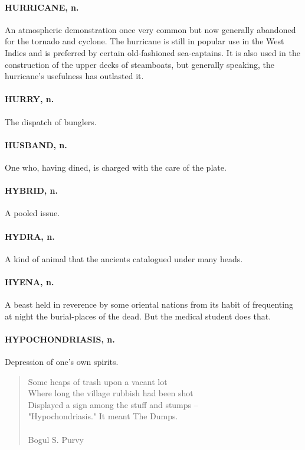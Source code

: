 \documentclass[11pt]{article}
\begin{document}
\paragraph{HURRICANE, n.}  An atmospheric demonstration once very common but now
generally abandoned for the tornado and cyclone.  The hurricane is
still in popular use in the West Indies and is preferred by certain
old-fashioned sea-captains.  It is also used in the construction of
the upper decks of steamboats, but generally speaking, the hurricane's
usefulness has outlasted it.

\paragraph{HURRY, n.}  The dispatch of bunglers.

\paragraph{HUSBAND, n.}  One who, having dined, is charged with the care of the
plate.

\paragraph{HYBRID, n.}  A pooled issue.

\paragraph{HYDRA, n.}  A kind of animal that the ancients catalogued under many
heads.

\paragraph{HYENA, n.}  A beast held in reverence by some oriental nations from its
habit of frequenting at night the burial-places of the dead.  But the
medical student does that.

\paragraph{HYPOCHONDRIASIS, n.}  Depression of one's own spirits.

\begin{quote}   Some heaps of trash upon a vacant lot \\
  Where long the village rubbish had been shot \\
  Displayed a sign among the stuff and stumps -- \\
  "Hypochondriasis."  It meant The Dumps. \\
 \\
Bogul S. Purvy \end{quote}
\end{document}
